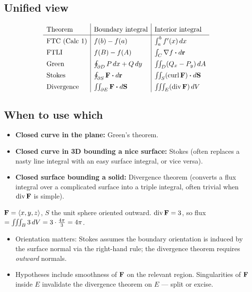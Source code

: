 \subsection{Unified view}
\begin{keybox}
\[
\renewcommand{\arraystretch}{1.4}
\begin{array}{l|l|l}
\text{Theorem} & \text{Boundary integral} & \text{Interior integral} \\\hline
\text{FTC (Calc 1)} & f(b) - f(a) & \int_a^b f'(x) \dx \\
\text{FTLI} & f(B) - f(A) & \int_C \grad f \dotp d\rr \\
\text{Green} & \oint_{\partial D} P\dx + Q\dy & \iint_D (Q_x - P_y) \dA \\
\text{Stokes} & \oint_{\partial S} \F \dotp d\rr & \iint_S (\curl \F) \dotp d\vc S \\
\text{Divergence} & \iint_{\partial E} \F \dotp d\vc S & \iiint_E (\divg \F) \dV
\end{array}
\]
\end{keybox}

\subsection{When to use which}
\begin{itemize}[leftmargin=*,nosep]
  \item \textbf{Closed curve in the plane:} Green's theorem.
  \item \textbf{Closed curve in 3D bounding a nice surface:} Stokes (often replaces a nasty line integral with an easy surface integral, or vice versa).
  \item \textbf{Closed surface bounding a solid:} Divergence theorem (converts a flux integral over a complicated surface into a triple integral, often trivial when $\operatorname{div} \mathbf{F}$ is simple).
\end{itemize}

\begin{example}
$\mathbf{F} = \langle x, y, z\rangle$, $S$ the unit sphere oriented outward.
$\operatorname{div} \mathbf{F} = 3$, so flux $= \iiint_{B} 3 \,dV = 3 \cdot \tfrac{4\pi}{3} = 4\pi$.
\end{example}

\begin{pitfallbox}
\begin{itemize}[leftmargin=*,nosep]
  \item Orientation matters: Stokes assumes the boundary orientation is induced by the surface normal via the right-hand rule; the divergence theorem requires \emph{outward} normals.
  \item Hypotheses include smoothness of $\mathbf{F}$ on the relevant region. Singularities of $\mathbf{F}$ inside $E$ invalidate the divergence theorem on $E$ --- split or excise.
\end{itemize}
\end{pitfallbox}
